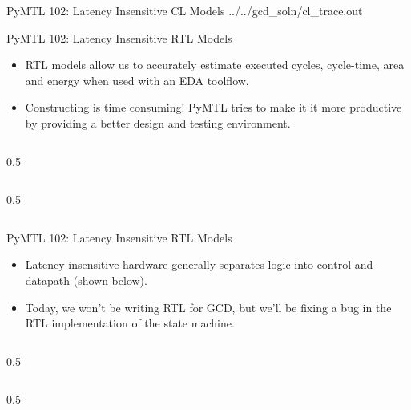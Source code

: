 \begin{frame}{PyMTL 102: Latency Insensitive CL Models}
\vspace{-0.25in}
%
{../../gcd_soln/cl_trace.out}

\end{frame}

\begin{frame}{PyMTL 102: Latency Insensitive RTL Models}

\begin{itemize}
  \item RTL models allow us to accurately estimate executed cycles,
        cycle-time, area and energy when used with an EDA toolflow.
  \smallskip
  \item Constructing is time consuming! PyMTL tries to make it it more
        productive by providing a better design and testing environment.
\end{itemize}

  \begin{cbxcols}
  \begin{column}{0.5\tw}
  \end{column}
  \begin{column}{0.5\tw}
  \end{column}
  \end{cbxcols}
\end{frame}

\begin{frame}{PyMTL 102: Latency Insensitive RTL Models}

\begin{itemize}
  \item Latency insensitive hardware generally separates logic into
        control and datapath (shown below).
  \smallskip
  \item Today, we won’t be writing RTL for GCD, but we’ll be fixing a bug
        in the RTL implementation of the state machine.
\end{itemize}

  \begin{cbxcols}
  \begin{column}{0.5\tw}
  \end{column}
  \begin{column}{0.5\tw}
  \end{column}
  \end{cbxcols}
\end{frame}


